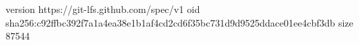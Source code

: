 version https://git-lfs.github.com/spec/v1
oid sha256:c92ffbc392f7a1a4ea38e1b1af4cd2cd6f35bc731d9d9525ddace01ee4cbf3db
size 87544
